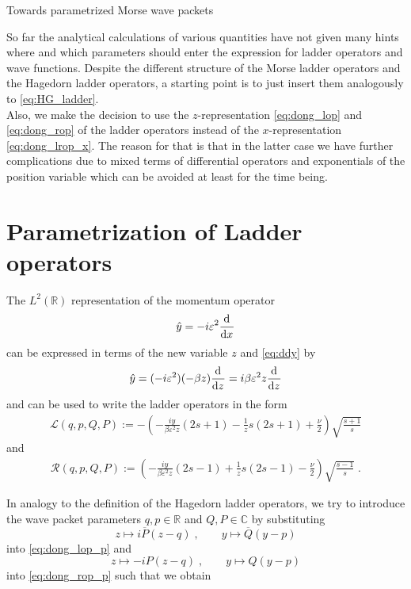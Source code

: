 \begin{chapter}{Towards parametrized Morse wave packets}

So far the analytical calculations of various quantities have not given many hints where and which parameters should enter the expression for ladder operators and wave functions. Despite the different structure of the Morse ladder operators and the Hagedorn ladder operators, a starting point is to just insert them analogously to \eqref{eq:HG_ladder}.\\

Also, we make the decision to use the $z$-representation \eqref{eq:dong_lop} and \eqref{eq:dong_rop} of the ladder operators instead of
the $x$-representation \eqref{eq:dong_lrop_x}. The reason for that is that in the latter case we have further complications due to 
mixed terms of differential operators and exponentials of the position variable which can be avoided at least for the time being.

\section{Parametrization of Ladder operators } %
\label{sec:Parametrization of Ladder }


The $L^2(\mathbb{R})$ representation of the momentum operator
\begin{equation}
   \hat{y}=-i\varepsilon^2\frac{\mathrm{d}^{}}{\mathrm{d}x^{}}
\end{equation}
can be expressed in terms of the new variable $z$ and \eqref{eq:ddy} by
\begin{equation}
    \label{eq:piny}
    \hat{y} = (-i \varepsilon^{2}) (-\beta z) \frac{\mathrm{d}^{}}{\mathrm{d}z^{}} = i\beta\varepsilon^2 z\frac{\mathrm{d}^{}}{\mathrm{d}z^{}}
\end{equation}
and can be used to write the ladder operators in the form
\begin{align}
    \label{eq:dong_lop_p}
    \mathcal{L}(q,p,Q,P):=-\left(-\frac{i y}{\beta\varepsilon^2 z}(2s+1)-\frac{1}{z}s(2s+1)+\frac{\nu}{2} \right)\sqrt{\frac{s+1}{s}}
\end{align}
and
\begin{align}
    \label{eq:dong_rop_p}
    \mathcal{R}(q,p,Q,P):=\left(-\frac{i y}{\beta\varepsilon^2 z }(2s-1)+\frac{1}{z}s(2s-1)-\frac{\nu}{2} \right)\sqrt{\frac{s-1}{s}}\;.
\end{align}

In analogy to the definition of the Hagedorn ladder operators, we try to introduce 
the wave packet parameters $q, p\in\mathbb{R}$ and $Q, P\in\mathbb{C}$ by substituting
\begin{equation}
    \label{eq:param_subst1}
    z\mapsto i\overline{P}(z-q)\;,\qquad y\mapsto \overline{Q}(y-p)
\end{equation}
into \eqref{eq:dong_lop_p} 
and
\begin{equation}
    \label{eq:param_subst2}
    z\mapsto -iP(z-q)\;,\qquad y\mapsto Q(y-p)
\end{equation}
into \eqref{eq:dong_rop_p} such that we obtain


\end{chapter}
